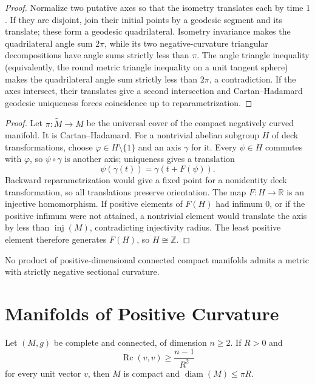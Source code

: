 \begin{proof}
\sketch
Normalize two putative axes so that the isometry translates each by time $1$.
If they are disjoint, join their initial points by a geodesic segment and its
translate; these form a geodesic quadrilateral.  Isometry invariance makes the
quadrilateral angle sum $2\pi$, while its two negative-curvature triangular
decompositions have angle sums strictly less than $\pi$.  The angle triangle
inequality (equivalently, the round metric triangle inequality on a unit
tangent sphere) makes the quadrilateral angle sum strictly less than $2\pi$,
a contradiction.  If the axes intersect, their translates give a second
intersection and Cartan--Hadamard geodesic uniqueness forces coincidence up to
reparametrization.
\end{proof}

\begin{proof}
\sketch
Let $\pi:\widetilde M\to M$ be the universal cover of the compact negatively
curved manifold.  It is Cartan--Hadamard.  For a nontrivial abelian subgroup
$H$ of deck transformations, choose $\varphi\in H\setminus\{1\}$ and an axis
$\gamma$ for it.  Every $\psi\in H$ commutes with $\varphi$, so $\psi\circ\gamma$
is another axis; uniqueness gives a translation
\[
\psi(\gamma(t))=\gamma(t+F(\psi)).
\]
Backward reparametrization would give a fixed point for a nonidentity deck
transformation, so all translations preserve orientation.  The map
$F:H\to\mathbb R$ is an injective homomorphism.  If positive elements of
$F(H)$ had infimum $0$, or if the positive infimum were not attained, a
nontrivial element would translate the axis by less than
$\operatorname{inj}(M)$, contradicting injectivity radius.  The least positive
element therefore generates $F(H)$, so $H\cong\mathbb Z$.
\end{proof}

\begin{corollary}
\label{cor:no-product-negative-sectional-curvature}
No product of positive-dimensional connected compact manifolds admits a
metric with strictly negative sectional curvature.
\end{corollary}

\section{Manifolds of Positive Curvature}

\begin{theorem}
\label{thm:myers-positive-ricci-geometric}



Let $(M,g)$ be complete and connected, of dimension $n\geq2$.  If $R>0$ and
\[
\operatorname{Rc}(v,v)\geq\frac{n-1}{R^2}
\]
for every unit vector $v$, then $M$ is compact and
$\operatorname{diam}(M)\leq\pi R$.
\end{theorem}

